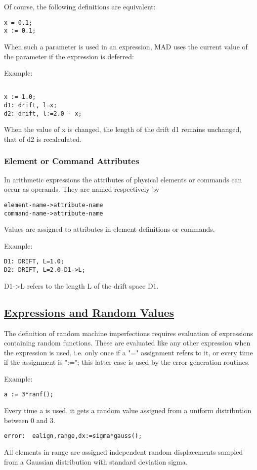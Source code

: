 Of course, the following definitions are equivalent:  
\begin{verbatim}
x = 0.1;
x := 0.1;
\end{verbatim}

When such a parameter is used in an expression, MAD uses the current
value of the parameter if the expression is deferred:  

Example: 
\begin{verbatim}

x := 1.0;
d1: drift, l=x;
d2: drift, l:=2.0 - x;
\end{verbatim} 
When the value of x is changed, the length of the drift d1 remains
unchanged, that of d2 is recalculated.   

\subsubsection{Element or Command Attributes} 
In arithmetic expressions the attributes of physical elements or
commands can occur as operands. They are named respectively by  
\begin{verbatim}
element-name->attribute-name
command-name->attribute-name
\end{verbatim} 

Values are assigned to attributes in element definitions or commands. 

Example: 
\begin{verbatim}
D1: DRIFT, L=1.0;
D2: DRIFT, L=2.0-D1->L;
\end{verbatim} 
D1-\textgreater L refers to the length L of the drift space D1.  

\subsection{\href{defer}{Expressions and Random Values}} 
\label{subsec:expr_rnd}
The definition of random machine imperfections requires evaluation of
expressions containing random functions. These are evaluated like any
other expression when the expression is used, i.e. only once if a "="
assignment refers to it, or every time if the assignment is ":="; this
latter case is used by the error generation routines.  

Example: 
\begin{verbatim}
a := 3*ranf();
\end{verbatim} 
Every time a is used, it gets a random value assigned from a uniform
distribution between 0 and 3.  

\begin{verbatim}
error:  ealign,range,dx:=sigma*gauss();
\end{verbatim} 
All elements in range are assigned independent random displacements
sampled from a Gaussian distribution with standard deviation sigma.  


